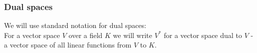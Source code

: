 \documentclass[a4paper, 12pt]{report}
\begin{document}
\subsubsection{Dual spaces}
We will use standard notation for dual spaces: \\
For a vector space $V$ over a field $K$ we will write $V^*$ for a vector space dual to $V$ -
a vector space of all linear functions from $V$ to $K$.
\end{document}
